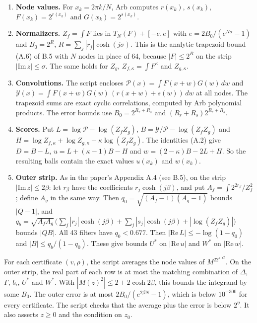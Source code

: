 \documentclass[10pt,a4paper]{article}
\begin{document}
\begin{enumerate}
\item \textbf{Node values.} For $x_k = 2\pi k/N$, Arb computes $r(x_k)$, $s(x_k)$, $F(x_k) = 2^{r(x_k)}$ and $G(x_k) = 2^{s(x_k)}$.
\item \textbf{Normalizers.} $Z_f = \int F$ lies in $T_N(F) + [-e, e]$ with $e = 2B_0/(e^{N\sigma} - 1)$ and $B_0 = 2^{R}$,
$R = \sum_j|r_j|\cosh(j\sigma)$. This is the analytic trapezoid bound (A.6) of B.5 with $N$ nodes in place of 64, because
$|F| \le 2^{R}$ on the strip $|\mathrm{Im}\,z| \le \sigma$. The same holds for
$Z_g$, $Z_{f,\kappa} = \int F^\kappa$ and $Z_{g,\kappa}$.
\item \textbf{Convolutions.} The script encloses $\mathcal P(x) = \int F(x+w)G(w)\,dw$ and
$\mathcal Y(x) = \int F(x+w)G(w)\,(r(x+w) + s(w))\,dw$ at all nodes. The trapezoid sums are exact cyclic correlations,
computed by Arb polynomial products. The error bounds use $B_0 = 2^{R_r + R_s}$ and $(R_r + R_s)2^{R_r + R_s}$.
\item \textbf{Scores.} Put $L = \log\mathcal P - \log(Z_fZ_g)$, $B = \mathcal Y/\mathcal P - \log(Z_fZ_g)$ and
$H = \log Z_{f,\kappa} + \log Z_{g,\kappa} - \kappa\log(Z_fZ_g)$. The identities (A.2) give $D = B - L$,
$u = L + (\kappa-1)B - H$ and $w = (2-\kappa)B - 2L + H$. So the resulting balls contain the exact values $u(x_k)$ and
$w(x_k)$.
\item \textbf{Outer strip.} As in the paper's Appendix A.4 (see B.5), on the strip $|\mathrm{Im}\,z| \le 2\beta$: let $r_\beta$ have the coefficients
$r_j\cosh(j\beta)$, and put $A_f = \int2^{2r_\beta}/Z_f^2$; define $A_g$ in the same way. Then
$q_0 = \sqrt{(A_f-1)(A_g-1)}$ bounds $|Q - 1|$, and
$q_b = \sqrt{A_fA_g}\,\big(\sum_j|r_j|\cosh(j\beta) + \sum_j|s_j|\cosh(j\beta) + |\log(Z_fZ_g)|\big)$ bounds $|QB|$.
All 43 filters have $q_0 < 0.677$. Then $|\mathrm{Re}\,L| \le -\log(1 - q_0)$ and $|B| \le q_b/(1-q_0)$. These
give bounds $U^*$ on $|\mathrm{Re}\,u|$ and $W^*$ on $|\mathrm{Re}\,w|$.
\end{enumerate}

For each certificate $(v, \rho)$, the script averages the node values of $M^22^{z\cdot G}$. On the outer strip, the real
part of each row is at most the matching combination of $\Delta$, $\Gamma$, $b_i$, $U^*$ and $W^*$. With
$|M(z)^2| \le 2 + 2\cosh2\beta$, this bounds the integrand by some $B_0$. The outer error is at most
$2B_0/(e^{2\beta N} - 1)$, which is below $10^{-300}$ for every certificate. The script checks that the average plus the
error is below $2^\eta$. It also asserts $z \ge 0$ and the condition on $z_0$.
\end{document}
